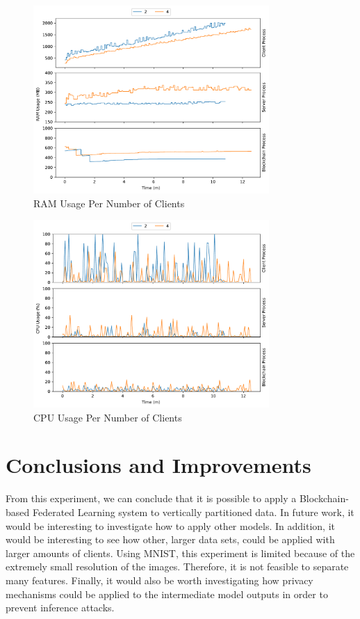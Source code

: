 \begin{figure}[!ht]
    \centering
    \centering
    \includegraphics[width=0.8\textwidth]{graphics/vertical/ram.pdf}
    \caption{RAM Usage Per Number of Clients}
    \label{fig:ram_vertical}
\end{figure}

\begin{figure}[!ht]
    \centering
    \centering
    \includegraphics[width=0.8\textwidth]{graphics/vertical/cpu.pdf}
    \caption{CPU Usage Per Number of Clients}
    \label{fig:cpu_vertical}
\end{figure}

\section{Conclusions and Improvements}

From this experiment, we can conclude that it is possible to apply a Blockchain-based Federated Learning system to vertically partitioned data. In future work, it would be interesting to investigate how to apply other models. In addition, it would be interesting to see how other, larger data sets, could be applied with larger amounts of clients. Using MNIST, this experiment is limited because of the extremely small resolution of the images. Therefore, it is not feasible to separate many features. Finally, it would also be worth investigating how privacy mechanisms could be applied to the intermediate model outputs in order to prevent inference attacks.
